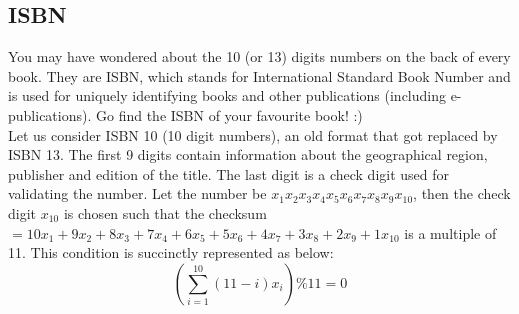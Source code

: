 \subsection{ISBN}
You may have wondered about the 10 (or 13) digits numbers on the back of every book. They are ISBN, which stands for International Standard Book Number and is used for uniquely identifying books and other publications (including e-publications). Go find the ISBN of your favourite book! :)\\
Let us consider ISBN 10 (10 digit numbers), an old format that got replaced by ISBN 13.
The first 9 digits contain information about the geographical region, publisher and edition of the title. The last digit is a check digit used for validating the number.
Let the number be $x_1x_2x_3x_4x_5x_6x_7x_8x_9x_{10}$, then the check digit $x_{10}$ is chosen such that the checksum $= 10x_1 + 9x_2 + 8x_3 + 7x_4 + 6x_5 + 5x_6 + 4x_7 + 3x_8 + 2x_9 + 1x_{10}$ is a multiple of 11.
This condition is succinctly represented as below:
\begin{equation}
{\displaystyle \left(\sum _{i=1}^{10}(11-i)x_{i} \right) \% 11 = 0}
\end{equation}
